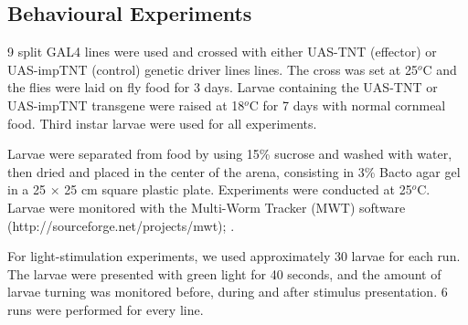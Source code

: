 \subsection{Behavioural Experiments}

9 split GAL4 lines were used and crossed with either UAS-TNT (effector) or UAS-impTNT (control) genetic driver lines lines.
The cross was set at 25$^o$C and the flies were laid on fly food for 3 days.
Larvae containing the UAS-TNT or UAS-impTNT transgene were raised at 18$^o$C for 7 days with normal cornmeal food.
Third instar larvae were used for all experiments.

Larvae were separated from food by using 15\% sucrose and washed with water, then dried and placed in the center of the arena, consisting in 3\% Bacto agar gel in a 25 × 25 cm square plastic plate.
Experiments were conducted at 25$^o$C.
Larvae were monitored with the Multi-Worm Tracker (MWT) software (http://sourceforge.net/projects/mwt); \citep{Ohyama2013PlosONE}.

For light-stimulation experiments, we used approximately 30 larvae for each run. The larvae were presented with green light for 40 seconds, and the amount of larvae turning was monitored before, during and after stimulus presentation. 6 runs were performed for every line.


